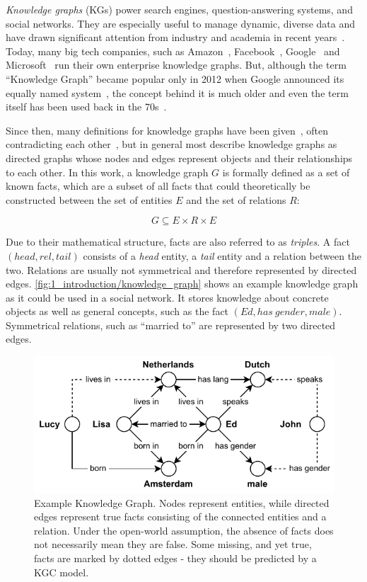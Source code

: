 \emph{Knowledge graphs} (KGs) power search engines, question-answering systems, and social networks. They are especially useful to manage dynamic, diverse data and have drawn significant attention from industry and academia in recent years~\cite{}. Today, many big tech companies, such as Amazon~\cite{AmazonKG}, Facebook~\cite{}, Google~\cite{} and Microsoft~\cite{MicrosoftKG} run their own enterprise knowledge graphs. But, although the term ``Knowledge Graph'' became popular only in 2012 when Google announced its equally named system~\cite{}, the concept behind it is much older and even the term itself has been used back in the 70s~\cite{}.

Since then, many definitions for knowledge graphs have been given~\cite{}, often contradicting each other~\cite{}, but in general most describe knowledge graphs as directed graphs whose nodes and edges represent objects and their relationships to each other. In this work, a knowledge graph $G$ is formally defined as a set of known facts, which are a subset of all facts that could theoretically be constructed between the set of entities $E$ and the set of relations $R$:

\[
    G \subseteq E \times R \times E
\]

Due to their mathematical structure, facts are also referred to as \emph{triples}. A fact $(head, rel, tail)$ consists of a \emph{head} entity, a \emph{tail} entity and a relation between the two. Relations are usually not symmetrical and therefore represented by directed edges. \autoref{fig:1_introduction/knowledge_graph} shows an example knowledge graph as it could be used in a social network. It stores knowledge about concrete objects as well as general concepts, such as the fact $(Ed, has~gender, male)$. Symmetrical relations, such as ``married to'' are represented by two directed edges.

\begin{figure}[t]
    \centering
    \includegraphics[]{1_introduction/knowledge_graph}
    \caption{Example Knowledge Graph. Nodes represent entities, while directed edges represent true facts consisting of the connected entities and a relation. Under the open-world assumption, the absence of facts does not necessarily mean they are false. Some missing, and yet true, facts are marked by dotted edges - they should be predicted by a KGC model.}
    \label{fig:1_introduction/knowledge_graph}
\end{figure}

